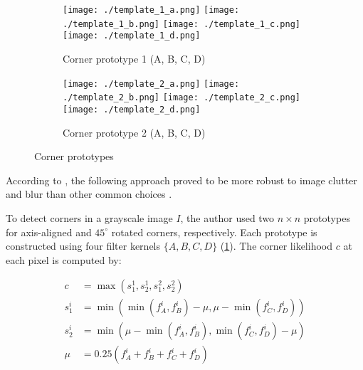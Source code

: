 \begin{figure}[h]
	\centering

	\begin{subfigure}{0.45\textwidth}
		\centering
		\begin{minipage}{\textwidth}
			\texttt{[image: ./template\_1\_a.png]}
			\texttt{[image: ./template\_1\_b.png]}
			\texttt{[image: ./template\_1\_c.png]}
			\texttt{[image: ./template\_1\_d.png]}
		\end{minipage}
		\caption{Corner prototype 1 (A, B, C, D)}
	\end{subfigure}
	\hfill
	\begin{subfigure}{0.45\textwidth}
		\centering
		\begin{minipage}{\textwidth}
			\texttt{[image: ./template\_2\_a.png]}
			\texttt{[image: ./template\_2\_b.png]}
			\texttt{[image: ./template\_2\_c.png]}
			\texttt{[image: ./template\_2\_d.png]}
		\end{minipage}
		\caption{Corner prototype 2 (A, B, C, D)}
	\end{subfigure}

	\caption{Corner prototypes \citep{geigerAutomaticCameraRange2012}}
	\label{fig:corner_prototypes}
\end{figure}

According to \cite{geigerAutomaticCameraRange2012}, the following approach proved to be
more robust to image clutter and blur than other common choices
\citep{harrisCombinedCornerEdge1988, shiGoodFeaturesTrack2000}.

To detect corners in a grayscale image $I$, the author used two $n \times n$ prototypes
for axis-aligned and $45^{\circ}$ rotated corners, respectively.
Each prototype
is constructed using four filter kernels $\{A, B, C, D\}$ (\cref{fig:corner_prototypes}). The corner likelihood
$c$ at each pixel is computed by:

\begin{equation}
	\begin{aligned}
		c     & =\max \left(s_1^1, s_2^1, s_1^2, s_2^2\right)                                             \\
		s_1^i & =\min \left(\min \left(f_A^i, f_B^i\right)-\mu, \mu-\min \left(f_C^i, f_D^i\right)\right) \\
		s_2^i & =\min \left(\mu-\min \left(f_A^i, f_B^i\right), \min \left(f_C^i, f_D^i\right)-\mu\right) \\
		\mu   & =0.25\left(f_A^i+f_B^i+f_C^i+f_D^i\right)
	\end{aligned}
\end{equation}


